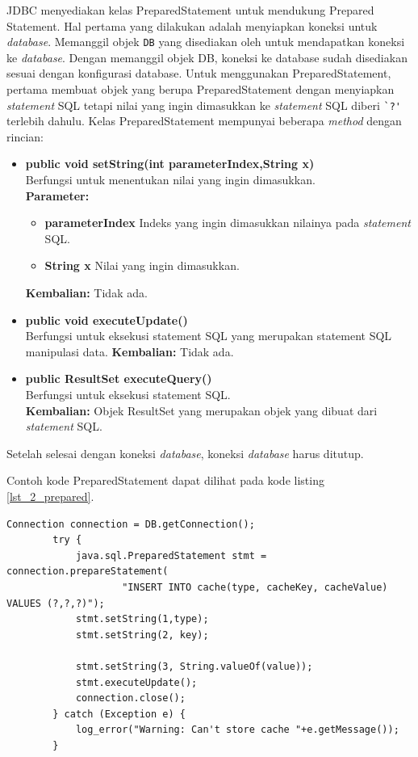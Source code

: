 JDBC menyediakan kelas PreparedStatement untuk mendukung Prepared Statement. Hal pertama yang dilakukan adalah menyiapkan koneksi untuk \textit{database}. Memanggil objek \verb!DB! yang disediakan oleh \play untuk mendapatkan koneksi ke \textit{database}. Dengan memanggil objek DB, koneksi ke database sudah disediakan sesuai dengan konfigurasi database. 
Untuk menggunakan PreparedStatement, pertama membuat objek yang berupa PreparedStatement dengan menyiapkan \textit{statement} SQL tetapi nilai yang ingin dimasukkan ke \textit{statement} SQL diberi \verb!`?'! terlebih dahulu.
Kelas PreparedStatement mempunyai beberapa \textit{method} dengan rincian: 
 \begin{itemize}
 	\item \textbf{public void setString(int parameterIndex,String x)}\\
 			Berfungsi untuk menentukan nilai yang ingin dimasukkan.\\[2\baselineskip]
 			\textbf{Parameter:}
 			\begin{itemize}
 				\item \textbf{parameterIndex} Indeks yang ingin dimasukkan nilainya pada \textit{statement} SQL.
 				\item \textbf{String x} Nilai yang ingin dimasukkan.
 			\end{itemize}
 			\textbf{Kembalian:} Tidak ada.
 	\item \textbf{public void executeUpdate()}\\
 			Berfungsi untuk eksekusi statement SQL yang merupakan statement SQL manipulasi data.
 			\textbf{Kembalian:} Tidak ada.
 	\item \textbf{public ResultSet executeQuery()}\\
 			Berfungsi untuk eksekusi statement SQL.\\
 			\textbf{Kembalian:} Objek ResultSet yang merupakan objek yang dibuat dari \textit{statement} SQL.
\end{itemize}
Setelah selesai dengan koneksi \textit{database}, koneksi \textit{database} harus ditutup.
 
 Contoh kode PreparedStatement dapat dilihat pada kode listing \ref{lst_2_prepared}.

\begin{lstlisting}[caption=Contoh PreparedStatement,label = {lst_2_prepared}]
		Connection connection = DB.getConnection();
        try {
            java.sql.PreparedStatement stmt = connection.prepareStatement(
                    "INSERT INTO cache(type, cacheKey, cacheValue) VALUES (?,?,?)");
            stmt.setString(1,type);
            stmt.setString(2, key);

            stmt.setString(3, String.valueOf(value));
            stmt.executeUpdate();
            connection.close();
        } catch (Exception e) {
            log_error("Warning: Can't store cache "+e.getMessage());
        }
\end{lstlisting}

